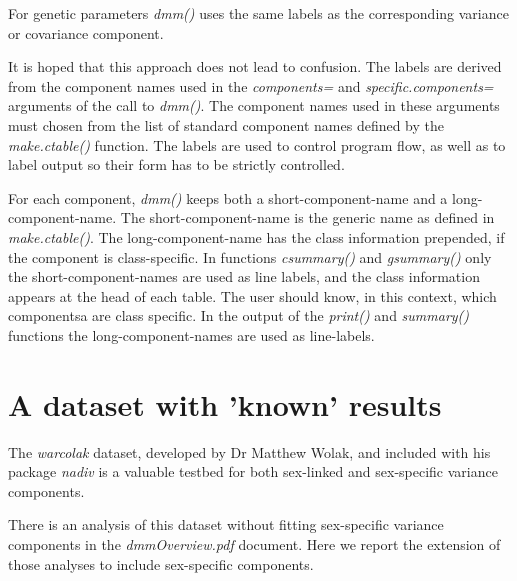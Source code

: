 \documentclass[titlepage]{article}  %
\begin{document}
For genetic parameters {\em dmm()} uses the same labels as the corresponding variance or covariance component. 

It is hoped that this approach does not lead to confusion. The labels are derived from the component names used in the {\em components=} and {\em specific.components=} arguments of the call to {\em dmm()}. The component names used in these arguments must chosen from the list of standard component names defined by the {\em make.ctable()} function. The labels are used to control program flow, as well as to label output so their form has to be strictly controlled.

For each component, {\em dmm()} keeps both a short-component-name and a long-component-name.
The short-component-name is the generic name as defined in {\em make.ctable()}. The long-component-name has the class information prepended, if the component is class-specific. In functions {\em csummary()} and {\em gsummary()} only the short-component-names are used as line labels, and the class information appears at the head of each table. The user should know, in this context, which componentsa are class specific. In the output of the {\em print()} and {\em summary()} functions the long-component-names are used as line-labels.


\section{A dataset with 'known' results}
The {\em warcolak} dataset, developed by Dr Matthew Wolak, and included with his package {\em nadiv} is a valuable testbed for both sex-linked and sex-specific variance components.
 
There is an analysis of this dataset without fitting sex-specific variance components in the {\em dmmOverview.pdf} document. Here we report the extension of those analyses to include sex-specific components.
\end{document}
